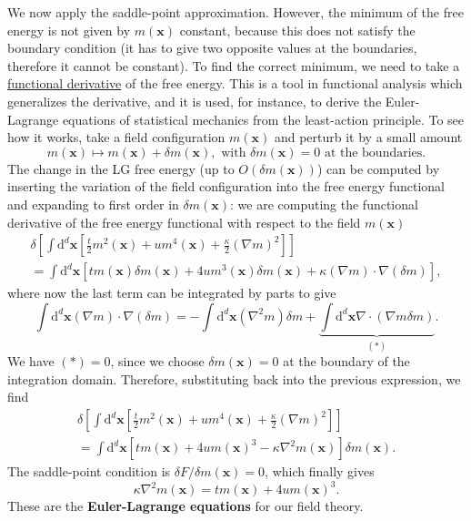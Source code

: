 We now apply the saddle-point approximation. However, the minimum of the free energy is not given by \( m(\mathbf{x}) \) constant, because this does not satisfy the boundary condition (it has to give two opposite values at the boundaries, therefore it cannot be constant).
To find the correct minimum, we need to take a \underline{functional derivative} of the free energy. This is a tool in functional analysis which generalizes the derivative, and it is used, for instance, to derive the Euler-Lagrange equations of statistical mechanics from the least-action principle. To see how it works, take a field configuration \( m(\mathbf{x}) \) and perturb it by a small amount
\[
    m(\mathbf{x}) \mapsto m(\mathbf{x}) + \delta m(\mathbf{x}), \text{ with } \delta m(\mathbf{x}) = 0 \text{ at the boundaries} .
\]
The change in the LG free energy (up to \( O(\delta m(\mathbf{x})) \)) can be computed by inserting the variation of the field configuration into the free energy functional and expanding to first order in \( \delta m(\mathbf{x}) \): we are computing the functional derivative of the free energy functional with respect to the field \( m(\mathbf{x}) \)
\[
    \begin{aligned}
        \delta \left[ \int \mathrm{d}^d \mathbf{x} \left[ \frac{t}{2} m^2(\mathbf{x}) + u m^4(\mathbf{x}) + \frac{\kappa}{2}(\nabla m)^2 \right] \right] \\
        = \int \mathrm{d}^d \mathbf{x} \left[ t m(\mathbf{x}) \delta m(\mathbf{x}) + 4 u m^3(\mathbf{x}) \delta m(\mathbf{x}) + \kappa (\nabla m) \cdot \nabla(\delta m) \right],
    \end{aligned}
\]
where now the last term can be integrated by parts to give
\[
    \int \mathrm{d}^d \mathbf{x} (\nabla m) \cdot \nabla(\delta m) = - \int \mathrm{d}^d \mathbf{x} (\nabla^2 m) \delta m + \underbrace{\int \mathrm{d}^d \mathbf{x} \nabla \cdot (\nabla m \delta m)}_{(*)}.
\]
We have \( (*) = 0 \), since we choose \( \delta m(\mathbf{x}) = 0 \) at the boundary of the
integration domain. Therefore, substituting back into the previous expression, we find
\[
    \begin{aligned}
        \delta \left[ \int \mathrm{d}^d \mathbf{x} \left[ \frac{t}{2} m^2(\mathbf{x}) + u m^4(\mathbf{x}) + \frac{\kappa}{2}(\nabla m)^2 \right] \right] \\
        = \int \mathrm{d}^d \mathbf{x} \left[ t m(\mathbf{x}) + 4 u m(\mathbf{x})^3 - \kappa \nabla^2 m(\mathbf{x}) \right] \delta m(\mathbf{x}).
    \end{aligned}
\]
The saddle-point condition is \( \delta F / \delta m(\mathbf{x}) = 0 \), which finally gives
\[
    \kappa \nabla^2 m(\mathbf{x}) = t m(\mathbf{x}) + 4 u m(\mathbf{x})^3.
\]
These are the \textbf{Euler-Lagrange equations} for our field theory.

